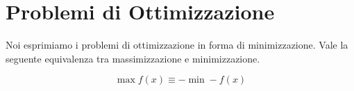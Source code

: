 \chapter{Problemi di Ottimizzazione}
\label{chp:optimization-problems}

Noi esprimiamo i problemi di ottimizzazione in forma di minimizzazione. Vale la seguente equivalenza tra massimizzazione e minimizzazione.

\begin{equation}
	\max f(x) \equiv -\min -f(x)
\end{equation}

